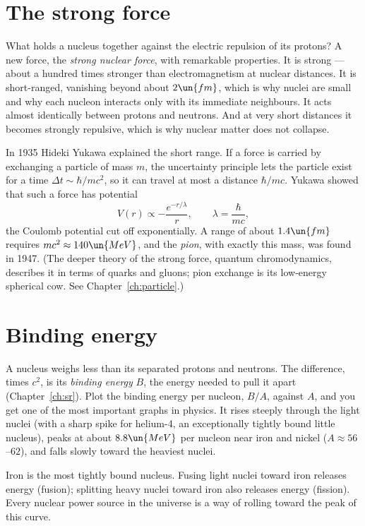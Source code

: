 \section{The strong force}

What holds a nucleus together against the electric repulsion of its protons? A new force, the \emph{strong nuclear force}, with remarkable properties. It is strong --- about a hundred times stronger than electromagnetism at nuclear distances. It is short-ranged, vanishing beyond about $2\un{fm}$, which is why nuclei are small and why each nucleon interacts only with its immediate neighbours. It acts almost identically between protons and neutrons. And at very short distances it becomes strongly repulsive, which is why nuclear matter does not collapse.

In 1935 Hideki Yukawa explained the short range. If a force is carried by exchanging a particle of mass $m$, the uncertainty principle lets the particle exist for a time $\Delta t\sim\hbar/mc^2$, so it can travel at most a distance $\hbar/mc$. Yukawa showed that such a force has potential
\[
  V(r)\propto-\frac{e^{-r/\lambda}}{r},\qquad\lambda = \frac{\hbar}{mc},
\]
the Coulomb potential cut off exponentially. A range of about $1.4\un{fm}$ requires $mc^2\approx140\un{MeV}$, and the \emph{pion}, with exactly this mass, was found in 1947. (The deeper theory of the strong force, quantum chromodynamics, describes it in terms of quarks and gluons; pion exchange is its low-energy spherical cow. See Chapter~\ref{ch:particle}.)

\section{Binding energy}

A nucleus weighs less than its separated protons and neutrons. The difference, times $c^2$, is its \emph{binding energy} $B$, the energy needed to pull it apart (Chapter~\ref{ch:sr}). Plot the binding energy per nucleon, $B/A$, against $A$, and you get one of the most important graphs in physics. It rises steeply through the light nuclei (with a sharp spike for helium-4, an exceptionally tightly bound little nucleus), peaks at about $8.8\un{MeV}$ per nucleon near iron and nickel ($A\approx56$--$62$), and falls slowly toward the heaviest nuclei.

\begin{keyidea}
Iron is the most tightly bound nucleus. Fusing light nuclei toward iron releases energy (fusion); splitting heavy nuclei toward iron also releases energy (fission). Every nuclear power source in the universe is a way of rolling toward the peak of this curve.
\end{keyidea}

